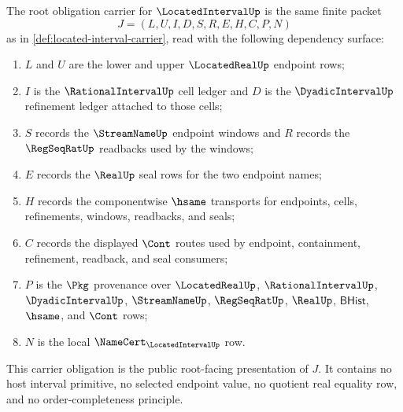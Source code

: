 \begin{definition}
\label{def:located-interval-carrier-obligation}
The root obligation carrier for $\LocatedIntervalUp$ is the same finite packet
$$
J=(L,U,I,D,S,R,E,H,C,P,N)
$$
as in \autoref{def:located-interval-carrier}, read with the following dependency surface:
\begin{enumerate}
\item $L$ and $U$ are the lower and upper $\LocatedRealUp$ endpoint rows;
\item $I$ is the $\RationalIntervalUp$ cell ledger and $D$ is the $\DyadicIntervalUp$ refinement ledger attached to those cells;
\item $S$ records the $\StreamNameUp$ endpoint windows and $R$ records the $\RegSeqRatUp$ readbacks used by the windows;
\item $E$ records the $\RealUp$ seal rows for the two endpoint names;
\item $H$ records the componentwise $\hsame$ transports for endpoints, cells, refinements, windows, readbacks, and seals;
\item $C$ records the displayed $\Cont$ routes used by endpoint, containment, refinement, readback, and seal consumers;
\item $P$ is the $\Pkg$ provenance over $\LocatedRealUp$, $\RationalIntervalUp$, $\DyadicIntervalUp$, $\StreamNameUp$, $\RegSeqRatUp$, $\RealUp$, $\mathsf{BHist}$, $\hsame$, and $\Cont$ rows;
\item $N$ is the local $\NameCert_{\LocatedIntervalUp}$ row.
\end{enumerate}
This carrier obligation is the public root-facing presentation of $J$. It contains no host interval primitive, no selected endpoint value, no quotient real equality row, and no order-completeness principle.
\end{definition}

